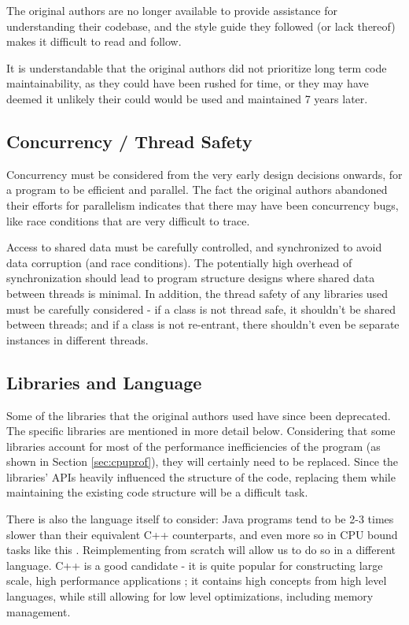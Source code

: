 \documentclass[a4paper,12pt]{report}
\begin{document}
The original authors are no longer available to provide assistance for understanding their codebase, and the style guide they followed (or lack thereof) makes it difficult to read and follow.

It is understandable that the original authors did not prioritize long term code maintainability, as they could have been rushed for time, or they may have deemed it unlikely their could would be used and maintained 7 years later.

\subsection{Concurrency / Thread Safety}

Concurrency must be considered from the very early design decisions onwards, for a program to be efficient and parallel. The fact the original authors abandoned their efforts for parallelism indicates that there may have been concurrency bugs, like race conditions \autocite{raceconditions} that are very difficult to trace.

Access to shared data must be carefully controlled, and synchronized to avoid data corruption (and race conditions). The potentially high overhead of synchronization should lead to program structure designs where shared data between threads is minimal. In addition, the thread safety of any libraries used must be carefully considered - if a class is not thread safe, it shouldn't be shared  between threads; and if a class is not re-entrant, there shouldn't even be separate instances in different threads.

\subsection{Libraries and Language}
Some of the libraries that the original authors used have since been deprecated. The specific libraries are mentioned in more detail below. Considering that some libraries account for most of the performance inefficiencies of the program (as shown in Section \ref{sec:cpuprof}), they will certainly need to be replaced. Since the libraries' APIs heavily influenced the structure of the code, replacing them while maintaining the existing code structure will be a difficult task.

There is also the language itself to consider: Java programs tend to be 2-3 times slower than their equivalent C++ counterparts, and even more so in CPU bound tasks like this \autocite{qtvjava}. Reimplementing from scratch will allow us to do so in a different language. C++ is a good candidate - it is quite popular for constructing large scale, high performance applications \autocite{cpp}; it contains high concepts from high level languages, while still allowing for low level optimizations, including memory management.
\end{document}
